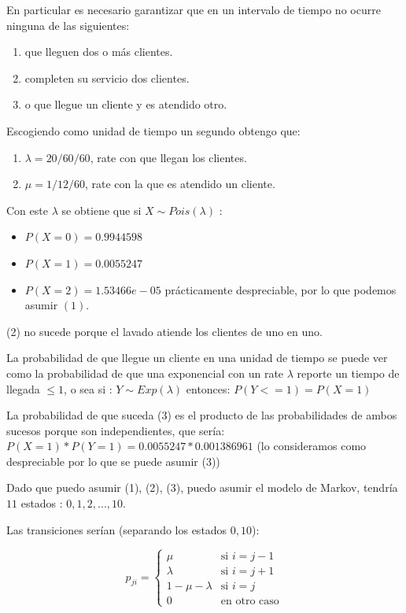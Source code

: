\documentclass[14pt]{extarticle}
\begin{document}
En particular es necesario garantizar que en un intervalo de tiempo no ocurre ninguna de las siguientes:
\begin{enumerate}
    \item que lleguen dos o más clientes.
    \item completen su servicio dos clientes.
    \item o que llegue un cliente y es atendido otro.
\end{enumerate}

Escogiendo como unidad de tiempo un segundo obtengo que:
\begin{enumerate}
	\item $\lambda = 20 / 60 / 60$, rate con que llegan los clientes.
	\item $\mu = 1 / 12 / 60$, rate con la que es atendido un cliente.
\end{enumerate}
	
Con este $\lambda$ se obtiene que si $X \sim Pois(\lambda)$ :
\begin{itemize}
    \item $P( X = 0 )  = 0.9944598$
    \item $P( X = 1 )  = 0.0055247$
    \item $P( X = 2 )  = 1.53466e-05$ prácticamente despreciable, por lo que podemos asumir $(1)$.
\end{itemize}

(2) no sucede porque el lavado atiende los clientes de uno en uno.

La probabilidad de que llegue un cliente en una unidad de tiempo se puede ver como la probabilidad de que una exponencial con un rate $\lambda$ reporte un tiempo de llegada $ \leq 1$, o sea si : $Y \sim Exp(\lambda)$ entonces: $P( Y <= 1) = P( X = 1)$

La probabilidad de que suceda (3) es el producto de las probabilidades de ambos sucesos porque son independientes, que sería: $P( X = 1) * P( Y = 1) = 0.0055247 * 0.001386961$ (lo consideramos como despreciable por lo que se puede asumir (3))
	
Dado que puedo asumir (1), (2), (3), puedo asumir el modelo de Markov, tendría $11$ estados : ${0, 1, 2, ..., 10}$.

Las transiciones serían (separando los estados $0, 10$):

$$
p_{ji} = \begin{cases}
  \mu  & \text{si $i = j-1$} \\
  \lambda  & \text{si $i = j+1$} \\
  1 - \mu  - \lambda  & \text{si $i = j$} \\
  0 & \text{en otro caso}
        \end{cases}
$$
\end{document}
